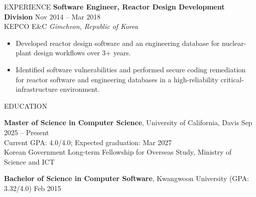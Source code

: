 \documentclass{resume}
\begin{document}
\begin{rSection}{EXPERIENCE}
\textbf{Software Engineer, Reactor Design Development Division} \hfill Nov 2014 -- Mar 2018\\
KEPCO E\&C \hfill \textit{Gimcheon, Republic of Korea}
\begin{itemize}
    \itemsep -4pt {}
    \item Developed reactor design software and an engineering database for nuclear-plant design workflows over 3+ years.
    \item Identified software vulnerabilities and performed secure coding remediation for reactor software and engineering databases in a high-reliability critical-infrastructure environment.
\end{itemize}

\end{rSection}

\begin{rSection}{EDUCATION}

{\bf Master of Science in Computer Science}, University of California, Davis \hfill {Sep 2025 -- Present}\\
Current GPA: 4.0/4.0; Expected graduation: Mar 2027\\
Korean Government Long-term Fellowship for Overseas Study, Ministry of Science and ICT

{\bf Bachelor of Science in Computer Software}, Kwangwoon University (GPA: 3.32/4.0) \hfill {Feb 2015}

\end{rSection}

\newpage
\end{document}
